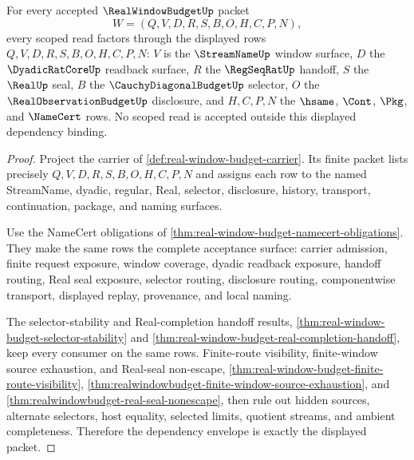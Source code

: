\begin{theorem}
\label{thm:realwindowbudget-scoped-dependency-binding}
For every accepted $\RealWindowBudgetUp$ packet
$$
W=(Q,V,D,R,S,B,O,H,C,P,N),
$$
every scoped read factors through the displayed rows
$Q,V,D,R,S,B,O,H,C,P,N$: $V$ is the $\StreamNameUp$ window surface, $D$ the
$\DyadicRatCoreUp$ readback surface, $R$ the $\RegSeqRatUp$ handoff, $S$ the
$\RealUp$ seal, $B$ the $\CauchyDiagonalBudgetUp$ selector, $O$ the
$\RealObservationBudgetUp$ disclosure, and $H,C,P,N$ the $\hsame$, $\Cont$,
$\Pkg$, and $\NameCert$ rows. No scoped read is accepted outside this
displayed dependency binding.
\end{theorem}
\begin{proof}
Project the carrier of \autoref{def:real-window-budget-carrier}. Its finite
packet lists precisely $Q,V,D,R,S,B,O,H,C,P,N$ and assigns each row to the
named StreamName, dyadic, regular, Real, selector, disclosure, history,
transport, continuation, package, and naming surfaces.

Use the NameCert obligations of
\autoref{thm:real-window-budget-namecert-obligations}. They make the same
rows the complete acceptance surface: carrier admission, finite request
exposure, window coverage, dyadic readback exposure, handoff routing, Real
seal exposure, selector routing, disclosure routing, componentwise transport,
displayed replay, provenance, and local naming.

The selector-stability and Real-completion handoff results,
\autoref{thm:real-window-budget-selector-stability} and
\autoref{thm:real-window-budget-real-completion-handoff}, keep every consumer
on the same rows. Finite-route visibility, finite-window source exhaustion,
and Real-seal non-escape, \autoref{thm:real-window-budget-finite-route-visibility},
\autoref{thm:realwindowbudget-finite-window-source-exhaustion}, and
\autoref{thm:realwindowbudget-real-seal-nonescape}, then rule out hidden
sources, alternate selectors, host equality, selected limits, quotient
streams, and ambient completeness. Therefore the dependency envelope is
exactly the displayed packet.
\end{proof}

